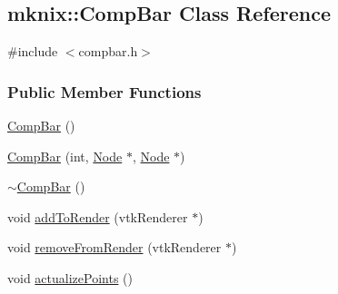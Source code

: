 \hypertarget{classmknix_1_1_comp_bar}{\subsection{mknix\-:\-:Comp\-Bar Class Reference}
\label{classmknix_1_1_comp_bar}
}


{\ttfamily \#include $<$compbar.\-h$>$}

\subsubsection*{Public Member Functions}
\begin{DoxyCompactItemize}
\item 
\hyperlink{classmknix_1_1_comp_bar_ab72db97465fe7f1bfa97204bad5528c3}{Comp\-Bar} ()
\item 
\hyperlink{classmknix_1_1_comp_bar_afdb8c9aeaa0ac6aec90075dad6e35c92}{Comp\-Bar} (int, \hyperlink{classmknix_1_1_node}{Node} $\ast$, \hyperlink{classmknix_1_1_node}{Node} $\ast$)
\item 
\hyperlink{classmknix_1_1_comp_bar_aad258dca0df1e017f189fc743baaf150}{$\sim$\-Comp\-Bar} ()
\item 
void \hyperlink{classmknix_1_1_comp_bar_adb7f828038ec2b850d93af242ce29faa}{add\-To\-Render} (vtk\-Renderer $\ast$)
\item 
void \hyperlink{classmknix_1_1_comp_bar_a8642880b1f8a552dc2e955dcf9f31331}{remove\-From\-Render} (vtk\-Renderer $\ast$)
\item 
void \hyperlink{classmknix_1_1_comp_bar_aadfecc285b6aecc94d45df348f1974b3}{actualize\-Points} ()
\end{DoxyCompactItemize}


